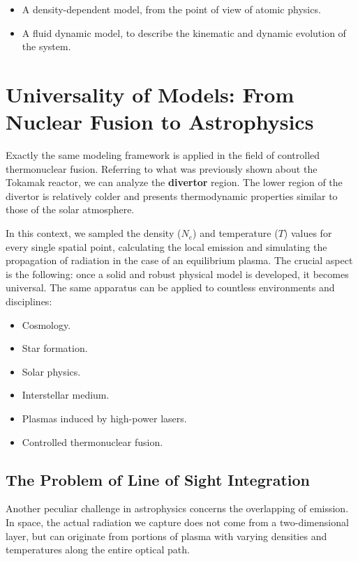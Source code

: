 \begin{itemize}
    \item A density-dependent model, from the point of view of atomic physics.
    \item A fluid dynamic model, to describe the kinematic and dynamic evolution of the system.
\end{itemize}

\section{Universality of Models: From Nuclear Fusion to Astrophysics}

Exactly the same modeling framework is applied in the field of controlled thermonuclear fusion. Referring to what was previously shown about the Tokamak reactor, we can analyze the \textbf{divertor} region. The lower region of the divertor is relatively colder and presents thermodynamic properties similar to those of the solar atmosphere.

In this context, we sampled the density ($N_e$) and temperature ($T$) values for every single spatial point, calculating the local emission and simulating the propagation of radiation in the case of an equilibrium plasma.
The crucial aspect is the following: once a solid and robust physical model is developed, it becomes universal. The same apparatus can be applied to countless environments and disciplines:

\begin{itemize}
    \item Cosmology.
    \item Star formation.
    \item Solar physics.
    \item Interstellar medium.
    \item Plasmas induced by high-power lasers.
    \item Controlled thermonuclear fusion.
\end{itemize}

    \subsection{The Problem of Line of Sight Integration}
    
    Another peculiar challenge in astrophysics concerns the overlapping of emission. In space, the actual radiation we capture does not come from a two-dimensional layer, but can originate from portions of plasma with varying densities and temperatures along the entire optical path.
    
